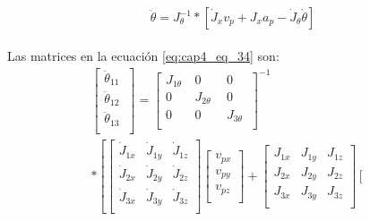     \vspace{-2.5em}

    \begin{align}
    \begin{split}
          \ddot{ \theta }=J_{ \theta }^{-1}\ast \left[ \dot{J}_{x}v_{p}+J_{x}a_{p}-\dot{J}_{ \theta }\dot{ \theta } \right] 
    \end{split}
    \label{eq:cap4_eq_34}
    \end{align}
    
    
    Las matrices en la ecuación \ref{eq:cap4_eq_34} son: 
        \vspace{-0.5em}
    \begin{multline}
            \left[ \begin{matrix}
        \ddot{ \theta }_{11}~\\
        \ddot{ \theta }_{12}\\
        \ddot{ \theta }_{13}~\\
        \end{matrix}\right] = \left[ \begin{matrix}
        J_{1 \theta }~  &  0  &  0\\
        0  &  J_{2 \theta }~~  &  0\\
        0  &  0  &  J_{3 \theta }~\\
        \end{matrix} \right] ^{-1} \\
    \ast         \left[  \left[ \begin{matrix}
        \dot{J}_{1x}  &  \dot{J}_{1y}  &  \dot{J}_{1z}\\
        \dot{J}_{2x}  &  \dot{J}_{2y}  &  \dot{J}_{2z}\\
        \dot{J}_{3x}  &  \dot{J}_{3y}  &  \dot{J}_{3z}\\
        \end{matrix}\right]   \left[ \begin{matrix}
        v_{px}\\
        v_{py}\\
        v_{pz}\\
        \end{matrix}\right]+\left[ \begin{matrix}
        J_{1x}  &  J_{1y}  &  J_{1z}\\
        J_{2x}  &  J_{2y}  &  J_{2z}\\
        J_{3x}  &  J_{3y}  &  J_{3z}\\
        \end{matrix} \right] \left[ \begin{matrix}

\end{matrix}
\end{multline}
